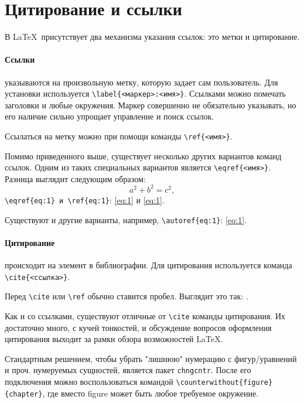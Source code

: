 
\section{Цитирование и ссылки}
В \LaTeX~присутствует два механизма указания ссылок: это метки и цитирование. 

\paragraph{Ссылки} указываются на произвольную метку, которую задает сам пользователь. Для установки используется \verb+\label{<маркер>:<имя>}+. Ссылками можно помечать заголовки и любые окружения. 
Маркер совершенно не обязательно указывать, но его наличие сильно упрощает управление и поиск ссылок. 

Ссылаться на метку можно при помощи команды \verb+\ref{<имя>}+.

Помимо приведенного выше, существует несколько других вариантов команд ссылок. Одним из таких специальных вариантов является \verb+\eqref{<имя>}+. Разница выглядит следующим образом:
\begin{equation}\label{eq:1}
    a^2+b^2=c^2, 
\end{equation}
\verb+\eqref{eq:1} и \ref{eq:1}+: \eqref{eq:1} и \ref{eq:1}.

Существуют и другие варианты, например, \verb+\autoref{eq:1}+: \autoref{eq:1}.

\paragraph{Цитирование} происходит на элемент в библиографии. Для цитирования используется команда \verb+\cite{<ссылка>}+. 

Перед \verb+\cite+ или \verb+\ref+ обычно ставится пробел. Выглядит это так: \cite{test}.

Как и со ссылками, существуют отличные от \verb+\cite+ команды цитирования. Их достаточно много, с кучей тонкостей, и обсуждение вопросов оформления цитирования выходит за рамки обзора возможностей \LaTeX.


Стандартным решением, чтобы убрать "лишнюю" нумерацию с фигур/уравнений и проч. нумеруемых сущностей, является пакет 
\verb+chngcntr+. После его подключения можно воспользоваться командой \verb+\counterwithout{figure}{chapter}+, где вместо figure может быть любое требуемое окружение.
